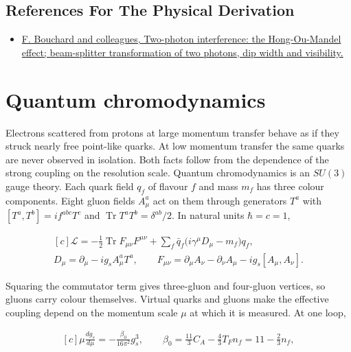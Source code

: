 \documentclass[11pt,oneside]{book}
\newenvironment{centeredalign}{\[\begin{gathered}[c]}{\end{gathered}\]}
\begin{document}
\subsection*{References For The Physical Derivation}
\begin{itemize}
\item \href{https://arxiv.org/abs/2006.09335}{F. Bouchard and colleagues, Two-photon interference: the Hong-Ou-Mandel effect; beam-splitter transformation of two photons, dip width and visibility.}
\end{itemize}





\clearpage

\section{Quantum chromodynamics}

\label{topic:quantum-chromodynamics}

Electrons scattered from protons at large momentum transfer behave as if they struck nearly free point-like quarks. At low momentum transfer the same quarks are never observed in isolation. Both facts follow from the dependence of the strong coupling on the resolution scale. Quantum chromodynamics is an \(SU(3)\) gauge theory. Each quark field \(q_f\) of flavour \(f\) and mass \(m_f\) has three colour components. Eight gluon fields \(A^a_\mu\) act on them through generators \(T^a\) with \([T^a,T^b]=if^{abc}T^c\) and \(\operatorname{Tr}T^aT^b=\delta^{ab}/2\). In natural units \(\hbar=c=1\),

\begin{centeredalign}
\mathcal L=-\frac12\operatorname{Tr}F_{\mu\nu}F^{\mu\nu}
+\sum_f\bar q_f\big(i\gamma^\mu D_\mu-m_f\big)q_f,\\
D_\mu=\partial_\mu-ig_sA^a_\mu T^a,\qquad
F_{\mu\nu}=\partial_\mu A_\nu-\partial_\nu A_\mu-ig_s[A_\mu,A_\nu].
\end{centeredalign}

Squaring the commutator term gives three-gluon and four-gluon vertices, so gluons carry colour themselves. Virtual quarks and gluons make the effective coupling depend on the momentum scale \(\mu\) at which it is measured. At one loop,

\begin{centeredalign}
\mu\frac{dg_s}{d\mu}=-\frac{\beta_0}{16\pi^2}g_s^3,\qquad
\beta_0=\frac{11}{3}C_A-\frac43T_Fn_f=11-\frac23n_f,
\end{centeredalign}
\end{document}

